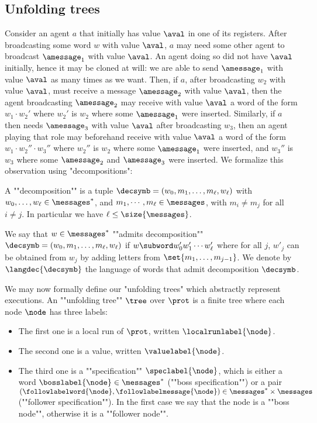 \subsection{Unfolding trees}
\label{sec:decidability-tree-unfoldings}

Consider an agent $a$ that initially has value $\aval$ in one of its registers. After broadcasting some word $w$ with value $\aval$, $a$ may need some other agent to broadcast $\amessage_1$ with value $\aval$. An agent doing so did not have $\aval$ initially, hence it may be cloned at will: we are able to send $\amessage_1$ with value $\aval$ as many times as we want. Then, if $a$, after broadcasting $w_2$ with value $\aval$, must receive a message $\amessage_2$ with value $\aval$, then the agent broadcasting $\amessage_2$ may receive with value $\aval$ a word of the form $w_1 \cdot w_2'$ where $w_2'$ is $w_2$ where some $\amessage_1$ were inserted. Similarly, if $a$ then needs $\amessage_3$ with value $\aval$ after broadcasting $w_3$, then an agent playing that role may beforehand receive with value $\aval$ a word of the form $w_1 \cdot w_2'' \cdot w_3''$ where $w_2''$ is $w_2$ where some $\amessage_1$ were inserted, and $w_3''$ is $w_3$ where some $\amessage_2$ and $\amessage_3$ were inserted. We formalize this observation using "decompositions":

A ""decomposition"" is a tuple $\decsymb = (w_0, m_1, \ldots, m_\ell, w_\ell)$ with $w_0, \ldots, w_\ell \in \messages^*$, and $m_1, \cdots, m_\ell \in \messages$, with $m_i \neq m_j$ for all $i\neq j$. In particular we have $\ell \leq \size{\messages}$. 

We say that $w \in \messages^*$ ""admits decomposition"" $\decsymb = (w_0, m_1, \ldots, m_\ell, w_\ell)$ if $w \subword w'_0 w'_1 \cdots w'_\ell$ where for all $j$, $w'_j$ can be obtained from $w_j$ by adding letters from $\set{m_1, \ldots, m_{j-1}}$.
We denote by $\langdec{\decsymb}$ the language of words that admit decomposition $\decsymb$. 

We may now formally define our "unfolding trees" which abstractly represent executions. 
An ""unfolding tree"" $\tree$ over $\prot$ is
a finite tree where each node $\node$ has three labels:
\begin{itemize}
	\item The first one is a local run of $\prot$, written $\localrunlabel{\node}$. 
	
	\item The second one is a value, written $\valuelabel{\node}$.
	
	\item The third one is a ""specification"" $\speclabel{\node}$, which is either a word $\bosslabel{\node} \in \messages^*$ (""boss specification"") or a pair $(\followlabelword{\node}, \followlabelmessage{\node}) \in \messages^* \times \messages$ (""follower specification""). In the first case we say that the node is a ""boss node"", otherwise it is a ""follower node"".
\end{itemize} 

